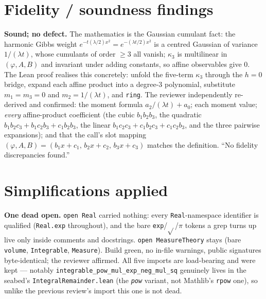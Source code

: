 \documentclass[11pt]{article}
\begin{document}
\section{Fidelity / soundness findings}
\textbf{Sound; no defect.} The mathematics is the Gaussian cumulant fact: the harmonic Gibbs weight
$e^{-t(\lambda/2)x^2}=e^{-(\lambda t/2)x^2}$ is a centred Gaussian of variance $1/(\lambda t)$, whose
cumulants of order $\ge 3$ all vanish; $\kappa_3$ is multilinear in $(\varphi,A,B)$ and invariant
under adding constants, so affine observables give $0$. The Lean proof realises this concretely:
unfold the five-term $\kappa_3$ through the $h=0$ bridge, expand each affine product into a degree-$3$
polynomial, substitute $m_1=m_3=0$ and $m_2=1/(\lambda t)$, and \texttt{ring}. The reviewer
independently re-derived and confirmed: the moment formula $a_2/(\lambda t)+a_0$; each moment value;
\emph{every} affine-product coefficient (the cubic $b_1b_2b_3$, the quadratic
$b_1b_2c_3+b_1c_2b_3+c_1b_2b_3$, the linear $b_1c_2c_3+c_1b_2c_3+c_1c_2b_3$, and the three pairwise
expansions); and that the call's slot mapping $(\varphi,A,B)=(b_1x+c_1,\,b_2x+c_2,\,b_3x+c_3)$ matches
the definition. ``No fidelity discrepancies found.''

\section{Simplifications applied}
\textbf{One dead open.} \texttt{open Real} carried nothing: every \texttt{Real}-namespace identifier is
qualified (\texttt{Real.exp} throughout), and the bare \texttt{exp}/$\sqrt{}$/$\pi$ tokens a grep
turns up live only inside comments and docstrings. \texttt{open MeasureTheory} stays (bare
\texttt{volume}, \texttt{Integrable}, \texttt{Measure}). Build green, no in-file warnings, public
signatures byte-identical; the reviewer affirmed. All five imports are load-bearing and were kept ---
notably \texttt{integrable\_pow\_mul\_exp\_neg\_mul\_sq} genuinely lives in the seabed's
\texttt{IntegralRemainder.lean} (the \emph{\texttt{pow}} variant, not Mathlib's \texttt{rpow} one), so
unlike the previous review's import this one is not dead.
\end{document}
